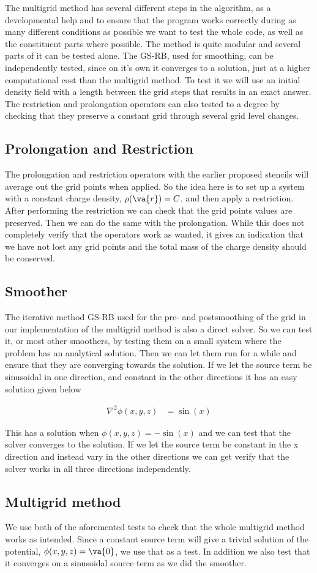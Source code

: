 
The multigrid method has several different steps in the algorithm, as a developmental help and to ensure that the program works correctly during as many different conditions as possible we want to test the whole code, as well as the constituent parts where possible. The method is quite modular and several parts of it can be tested alone. The GS-RB, used for smoothing, can be independently tested, since on it's own it converges to a solution, just at a higher computational cost than the multigrid method. To test it we will use an initial density field with a length between the grid steps that results in an exact answer. The restriction and prolongation operators can also tested to a degree by checking that they preserve a constant grid through several grid level changes. 

\subsection{Prolongation and Restriction}
	The prolongation and restriction operators with the earlier proposed stencils will average out the grid points when applied. So the idea here is to set up a system with a constant charge density, \(\rho(\va{r}) = C\), and then apply a restriction. After performing the restriction we can check that the grid points values are preserved. Then we can do the same with the prolongation. While this does not completely verify that the operators work as wanted, it gives an indication that we have not lost any grid points and the total mass of the charge density should be conserved.

\subsection{Smoother}
	The iterative method GS-RB used for the pre- and postsmoothing of the grid in our implementation of the multigrid method is also a direct solver. So we can test it, or most other smoothers, by testing them on a small system where the problem has an analytical solution. Then we can let them run for a while and ensure that they are converging towards the solution. If we let the source term be sinusoidal in one direction, and constant in the other directions it has an easy solution given below

	\begin{align}
		\nabla^2 \phi(x,y,z) &= \sin(x)
	\end{align}

	This has a solution when \(\phi(x,y,z) = -\sin(x)\) and we can test that the solver converges to the solution. If we let the source term be constant in the x direction and instead vary in the other directions we can get verify that the solver works in all three directions independently.

\subsection{Multigrid method}
	We use both of the aforemented tests to check that the whole multigrid method works as intended. Since a constant source term will give a trivial solution of the potential, \(\phi(x,y,z) = \va{0}\), we use that as a test. In addition we also test that it converges on a sinusoidal source term as we did the smoother.
